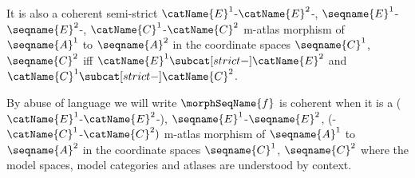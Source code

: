 \documentclass{article}
\begin{document}
\begin{definition}
It is also a coherent semi-strict
\nobreaks
  {
    {$\catName{E}^1$-$\catName{E}^2$-},
    {$\seqname{E}^1$-$\seqname{E}^2$-},
    {$\catName{C}^1$-$\catName{C}^2$}
  }
m-atlas morphism of $\seqname{A}^1$ to $\seqname{A}^2$ in the
coordinate spaces $\seqname{C}^1$, $\seqname{C}^2$ iff
$\catName{E}^1 \subcat[strict-] \catName{E}^2$ and
$\catName{C}^1 \subcat[strict-] \catName{C}^2$.

By abuse of language we will write $\morphSeqName{f}$ is coherent when it
is a
\nobreaks
  {
    {($\catName{E}^1$-$\catName{E}^2$-)},
    {$\seqname{E}^1$-$\seqname{E}^2$},
    {(-$\catName{C}^1$-$\catName{C}^2)$}
  }
m-atlas morphism of $\seqname{A}^1$ to $\seqname{A}^2$ in the
coordinate spaces $\seqname{C}^1$, $\seqname{C}^2$ where the model
spaces, model categories and atlases are understood by context.
\end{definition}
\end{document}
